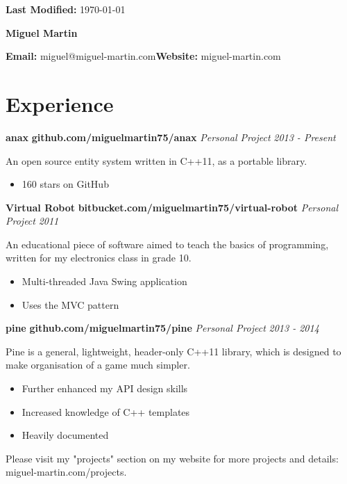\documentclass[10pt,oneside,a4paper]{article}
\newcommand{\project}[5] 
{
    {
    \textbf{#1} \hfill {\footnotesize\textbf{#2}}\newline
    \emph{#3} \hfill \emph{#4}
    }

    {
        \begin{description}[leftmargin=0.5cm, itemindent=0cm]
        \item {#5}
        \end{description}
    }
}
\newcommand{\info}[2] 
{
    {
        \section*{#1}
        \hrulefill\newline
    }

    {#2}
}
\begin{document}
{
    \raggedleft
    \footnotesize
    \textbf{Last Modified:} \today

    \centering
    {\huge\textbf{Miguel Martin}}

    \textbf{Email:} miguel@miguel-martin.com\hfill\textbf{Website:} miguel-martin.com\newline
}

\info{Experience}
{
    {
        \project{anax}{github.com/miguelmartin75/anax}
        {Personal Project}{2013 - Present}
        {
            An open source entity system written in C++11, as a portable library.
            \begin{itemize}
                \item 160 stars on GitHub
            \end{itemize}
        }
        \project{Virtual Robot}{bitbucket.com/miguelmartin75/virtual-robot}
        {Personal Project}{2011}
        {
            An educational piece of software aimed to teach the basics of programming,
            written for my electronics class in grade 10.
            \begin{itemize}
                \item Multi-threaded Java Swing application
                \item Uses the MVC pattern
            \end{itemize}
        }
        \project{pine}{github.com/miguelmartin75/pine}
        {Personal Project}{2013 - 2014}
        {
            Pine is a general, lightweight, header-only C++11 library, which is designed to make organisation of a game much simpler. 
            \begin{itemize}
                \item Further enhanced my API design skills
                \item Increased knowledge of C++ templates
                \item Heavily documented
            \end{itemize}
        }
        Please visit my "projects" section on my website for more projects and details: miguel-martin.com/projects.
    }
}
\end{document}
